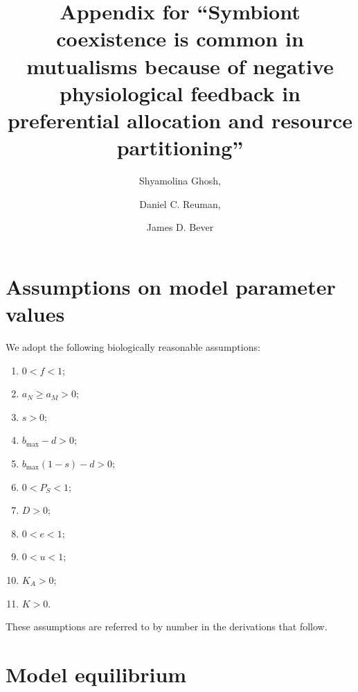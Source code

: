\documentclass[letterpaper,11pt]{article}
\title{Appendix for ``Symbiont coexistence is common in mutualisms because of negative physiological feedback in preferential allocation and resource partitioning''}
\author{Shyamolina Ghosh, \and Daniel C. Reuman, \and James D. Bever}
\date{}
\newcommand{\bmax}{b_{\text{max}}}
\begin{document}
\maketitle

\section{Assumptions on model parameter values}\label{sect:assumptions}

\noindent We adopt the following biologically reasonable assumptions:
\begin{enumerate}
\item $0<f<1$;
\item $a_N \geq a_M > 0$;
\item $s>0$;
\item $\bmax-d>0$;
\item $\bmax(1-s)-d>0$;
\item $0<P_S<1$;
\item $D>0$;
\item $0<e<1$;
\item $0<u<1$;
\item $K_A>0$;
\item $K>0$.
\end{enumerate}
These assumptions are referred to by number in the derivations that follow.

\section{Model equilibrium}\label{sect:equil}
\end{document}
